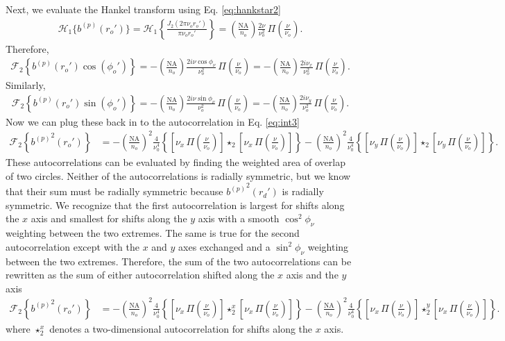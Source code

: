 \documentclass[11pt]{article}
\begin{document}
Next, we evaluate the Hankel transform using Eq. \ref{eq:hankstar2}
\begin{align}
  \mathcal{H}_{1}\{{b^{(p)}}(r_o')\} = \mathcal{H}_{1}\left\{\frac{J_{2}(2\pi \nu_or_o')}{\pi\nu_o r_o'}\right\} =
  \left(\frac{\text{NA}}{n_o}\right)\frac{2\nu}{\nu_o^{2}}\, \Pi\left(\frac{\nu}{\nu_o}\right).
\end{align}
Therefore, 
\begin{align}
  \mathcal{F}_2\left\{{b^{(p)}}(r_o')\cos(\phi_o')\right\} = -\left(\frac{\text{NA}}{n_o}\right)\frac{2i\nu\cos\phi_\nu}{\nu_o^2}\, \Pi\left(\frac{\nu}{\nu_o}\right) = -\left(\frac{\text{NA}}{n_o}\right)\frac{2i\nu_x}{\nu_o^2}\, \Pi\left(\frac{\nu}{\nu_o}\right).
\end{align}
Similarly,
\begin{align}
  \mathcal{F}_2\left\{{b^{(p)}}(r_o')\sin(\phi_o')\right\} = -\left(\frac{\text{NA}}{n_o}\right)\frac{2i\nu\sin\phi_\nu}{\nu_o^2}\, \Pi\left(\frac{\nu}{\nu_o}\right) = -\left(\frac{\text{NA}}{n_o}\right)\frac{2i\nu_y}{\nu_o^2}\, \Pi\left(\frac{\nu}{\nu_o}\right).  
\end{align}
Now we can plug these back in to the autocorrelation in Eq. \ref{eq:int3}
\begin{align}
    \mathcal{F}_2\left\{{b^{(p)}}^2(r_o')\right\} &= -\left(\frac{\text{NA}}{n_o}\right)^2\frac{4}{\nu_0^4}\left\{\left[\nu_x\, \Pi\left(\frac{\nu}{\nu_o}\right)\right] \star_2 \left[\nu_x\, \Pi\left(\frac{\nu}{\nu_o}\right)\right]\right\} - \left(\frac{\text{NA}}{n_o}\right)^2\frac{4}{\nu_0^4}\left\{\left[\nu_y\, \Pi\left(\frac{\nu}{\nu_o}\right)\right] \star_2 \left[\nu_y\, \Pi\left(\frac{\nu}{\nu_o}\right)\right]\right\}.\label{eq:auto}
\end{align}
These autocorrelations can be evaluated by finding the weighted area of overlap
of two circles. Neither of the autocorrelations is radially symmetric, but we
know that their sum must be radially symmetric because ${b^{(p)}}^2(r_d')$ is
radially symmetric. We recognize that the first autocorrelation is largest for
shifts along the $x$ axis and smallest for shifts along the $y$ axis with a
smooth $\cos^2\phi_\nu$ weighting between the two extremes. The same is true for
the second autocorrelation except with the $x$ and $y$ axes exchanged and a
$\sin^2\phi_\nu$ weighting between the two extremes. Therefore, the sum of the two
autocorrelations can be rewritten as the sum of either autocorrelation shifted along
the $x$ axis and the $y$ axis
\begin{align}
    \mathcal{F}_2\left\{{b^{(p)}}^2(r_o')\right\} &= -\left(\frac{\text{NA}}{n_o}\right)^2\frac{4}{\nu_0^4}\left\{\left[\nu_x\, \Pi\left(\frac{\nu}{\nu_o}\right)\right] \star_2^x \left[\nu_x\, \Pi\left(\frac{\nu}{\nu_o}\right)\right]\right\} - \left(\frac{\text{NA}}{n_o}\right)^2\frac{4}{\nu_0^4}\left\{\left[\nu_x\, \Pi\left(\frac{\nu}{\nu_o}\right)\right] \star_2^y \left[\nu_x\, \Pi\left(\frac{\nu}{\nu_o}\right)\right]\right\}.
\end{align}
where $\star_2^x$ denotes a two-dimensional autocorrelation for shifts along the
$x$ axis.
\end{document}
